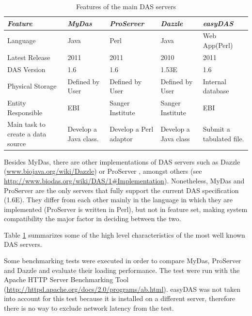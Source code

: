 \begin{table}[t]
        \begin{tabular}{|p{3cm}|p{2.7cm}|p{2.7cm}|p{2.7cm}|p{2.7cm}|}
\hline 
\emph{Feature} & \emph{MyDas} & \emph{ProServer} & \emph{Dazzle} & \emph{easyDAS}\\
\hline 
Language & Java & Perl & Java & Web App(Perl)\\
\hline 
Latest Release & 2011 & 2011 & 2010 & 2011\\
\hline 
DAS Version & 1.6 & 1.6 & 1.53E\footnotemark  & 1.6\\
\hline 
Physical Storage & Defined by User & Defined by User & Defined by User & Internal database\\
\hline 
Entity Responsible & EBI & Sanger Institute & Sanger Institute & EBI\\
\hline 
Main task to create a data source & Develop a Java class. & Develop a Perl adaptor & Develop a Java class & Submit a tabulated file.\\
\hline 
        \end{tabular}
        \caption{Features of the main DAS servers}
        \label{tab:table1}
\end{table}

Besides MyDas, there are other implementations of DAS servers such as Dazzle (\url{www.biojava.org/wiki/Dazzle}) or ProServer \cite{FIN2007},  amongst others (see \url{http://www.biodas.org/wiki/DAS/1#Implementation}). Nonetheless, MyDas and ProServer are the only servers that fully support the current DAS specification (1.6E). They differ from each other mainly in the language in which they are implemented (ProServer is written in Perl), but not in feature set, making system compatibility the major factor in deciding between the two.

Table \ref{tab:table1} summarizes some of the high level characteristics of the most well known DAS servers.


Some benchmarking tests were executed in order to compare  MyDas, ProServer and Dazzle and evaluate their loading performance. The test were run with the Apache HTTP Server Benchmarking Tool (\url{http://httpd.apache.org/docs/2.0/programs/ab.html}).  easyDAS was not taken into account for this test because it is installed on a different server, therefore there is no way to exclude network latency from the test.

